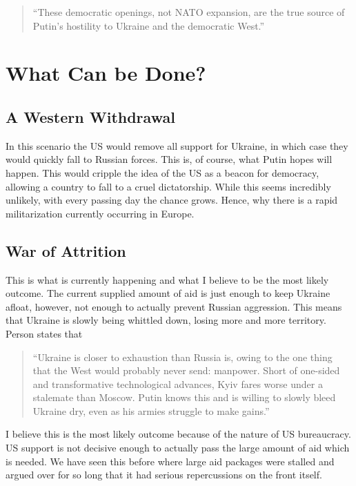 \documentclass{article}
\begin{document}
    \begin{quote}
        ``These democratic openings, not NATO expansion, are the true source of Putin's hostility to Ukraine and the democratic West.'' \parencite{person_2025}
    \end{quote}

\section{What Can be Done?}
    
    \subsection{A Western Withdrawal}
        In this scenario the US would remove all support for Ukraine, in which case they would quickly fall to Russian forces. This is, of course, what Putin hopes will happen. This would cripple the idea of the US as a beacon for democracy, allowing a country to fall to a cruel dictatorship. While this seems incredibly unlikely, with every passing day the chance grows. Hence, why there is a rapid militarization currently occurring in Europe.

    \subsection{War of Attrition}
        This is what is currently happening and what I believe to be the most likely outcome. The current supplied amount of aid is just enough to keep Ukraine afloat, however, not enough to actually prevent Russian aggression. This means that Ukraine is slowly being whittled down, losing more and more territory. Person states that
        
        \begin{quote}
            ``Ukraine is closer to exhaustion than Russia is, owing to the one thing that the West would probably never send: manpower. Short of one-sided and transformative technological advances, Kyiv fares worse under a stalemate than Moscow. Putin knows this and is willing to slowly bleed Ukraine dry, even as his armies struggle to make gains.'' \parencite{person_2025}
        \end{quote}

        I believe this is the most likely outcome because of the nature of US bureaucracy. US support is not decisive enough to actually pass the large amount of aid which is needed. We have seen this before where large aid packages were stalled and argued over for so long that it had serious repercussions on the front itself.
\end{document}
